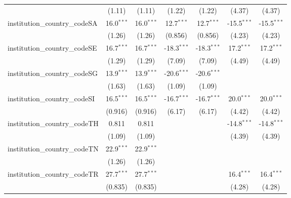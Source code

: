 \begin{tabular}{lcccccc}
                                         & (1.11)        & (1.11)        & (1.22)        & (1.22)        & (4.37)        & (4.37)\\   
   institution\_country\_codeSA          & 16.0$^{***}$  & 16.0$^{***}$  & 12.7$^{***}$  & 12.7$^{***}$  & -15.5$^{***}$ & -15.5$^{***}$\\   
                                         & (1.26)        & (1.26)        & (0.856)       & (0.856)       & (4.23)        & (4.23)\\   
   institution\_country\_codeSE          & 16.7$^{***}$  & 16.7$^{***}$  & -18.3$^{***}$ & -18.3$^{***}$ & 17.2$^{***}$  & 17.2$^{***}$\\   
                                         & (1.29)        & (1.29)        & (7.09)        & (7.09)        & (4.49)        & (4.49)\\   
   institution\_country\_codeSG          & 13.9$^{***}$  & 13.9$^{***}$  & -20.6$^{***}$ & -20.6$^{***}$ &               &   \\   
                                         & (1.63)        & (1.63)        & (1.09)        & (1.09)        &               &   \\   
   institution\_country\_codeSI          & 16.5$^{***}$  & 16.5$^{***}$  & -16.7$^{***}$ & -16.7$^{***}$ & 20.0$^{***}$  & 20.0$^{***}$\\   
                                         & (0.916)       & (0.916)       & (6.17)        & (6.17)        & (4.42)        & (4.42)\\   
   institution\_country\_codeTH          & 0.811         & 0.811         &               &               & -14.8$^{***}$ & -14.8$^{***}$\\   
                                         & (1.09)        & (1.09)        &               &               & (4.39)        & (4.39)\\   
   institution\_country\_codeTN          & 22.9$^{***}$  & 22.9$^{***}$  &               &               &               &   \\   
                                         & (1.26)        & (1.26)        &               &               &               &   \\   
   institution\_country\_codeTR          & 27.7$^{***}$  & 27.7$^{***}$  &               &               & 16.4$^{***}$  & 16.4$^{***}$\\   
                                         & (0.835)       & (0.835)       &               &               & (4.28)        & (4.28)\\   

\end{tabular}

